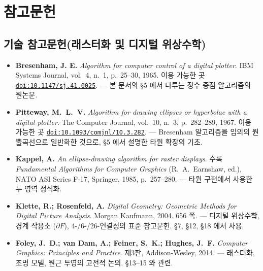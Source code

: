 \documentclass[12pt,a4paper]{scrartcl}
\newcommand{\biblink}[2]{\href{#1}{\nolinkurl{#2}}}
\begin{document}
\section*{\color{accent}참고문헌}
\label{sec:bib}

\subsection*{기술 참고문헌(래스터화 및 디지털 위상수학)}

\begin{itemize}[leftmargin=1.4em,itemsep=0.3em,topsep=0.3em]
  \item \textbf{Bresenham, J. E.} \emph{Algorithm for computer control of a digital plotter}.
        IBM Systems Journal, vol.~4, n.~1, p.~25--30, 1965.
        이용 가능한 곳 \biblink{https://doi.org/10.1147/sj.41.0025}{doi:10.1147/sj.41.0025}.
        --- 본 문서의 §5 에서 다루는 정수 중점 알고리즘의 원논문.

  \item \textbf{Pitteway, M.~L.~V.} \emph{Algorithm for drawing ellipses or hyperbolae
        with a digital plotter}. The Computer Journal, vol.~10, n.~3, p.~282--289, 1967.
        이용 가능한 곳 \biblink{https://doi.org/10.1093/comjnl/10.3.282}{doi:10.1093/comjnl/10.3.282}.
        --- Bresenham 알고리즘을 임의의 원뿔곡선으로 일반화한 것으로, §5 에서 설명한 타원 확장의 기초.

  \item \textbf{Kappel, A.} \emph{An ellipse-drawing algorithm for raster displays}.
        수록 \emph{Fundamental Algorithms for Computer Graphics} (R.~A.~Earnshaw, ed.),
        NATO ASI Series F-17, Springer, 1985, p.~257--280.
        --- 타원 구현에서 사용한 두 영역 정식화.

  \item \textbf{Klette, R.; Rosenfeld, A.} \emph{Digital Geometry: Geometric Methods
        for Digital Picture Analysis}. Morgan Kaufmann, 2004. 656 쪽.
        --- 디지털 위상수학, 경계 작용소 ($\partial F$), 4-/6-/26-연결성의 표준 참고문헌. §7, §12, §18 에서 사용.

  \item \textbf{Foley, J.~D.; van Dam, A.; Feiner, S.~K.; Hughes, J.~F.}
        \emph{Computer Graphics: Principles and Practice}. 제3판, Addison-Wesley, 2014.
        --- 래스터화, 조명 모델, 원근 투영의 고전적 논의. §13--15 와 관련.
\end{itemize}
\end{document}
